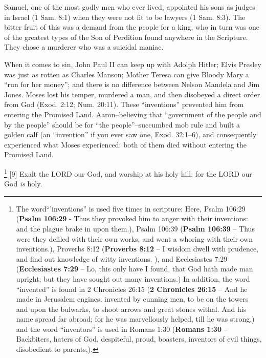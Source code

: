 {\begin{compactenum}
\item Samuel, one of
the most godly men who ever lived, appointed
his sons as judges in Israel (1 Sam. 8:1) when
they were not fit to be lawyers (1 Sam. 8:3).
The bitter fruit of this was a demand from the
people for a king, who in turn was one of the
greatest types of the Son of Perdition found
anywhere in the Scripture. They chose a
murderer who was a suicidal maniac.
\end{compactenum}
When it comes to sin, John Paul II can keep up with Adolph Hitler; Elvis Presley was just as rotten as Charles Manson; Mother Teresa can give Bloody Mary a ``run for her money''; and there is no difference between Nelson Mandela and Jim Jones. Moses lost his temper, murdered a man, and then disobeyed a direct order from God (Exod. 2:12; Num. 20:11). These “inventions” prevented him from entering the Promised Land. Aaron--believing that “government of the people and by the people” should be for “the people”--succumbed  mob rule and built a golden calf (an “invention” if you ever saw one, Exod. 32:1--6), and consequently experienced what Moses
experienced: both of them died without
entering the Promised Land. 
 \cite{Ruckman1992psalms}} \footnote{The word``'inventions'' is used five times in scripture: Here, Psalm 106:29 (\textbf{Psalm 106:29} - Thus they provoked him to anger with their inventions: and the plague brake in upon them.), Psalm 106:39 (\textbf{Psalm 106:39} -- Thus were they defiled with their own works, and went a whoring with their own inventions.), Proverbs 8:12 (\textbf{Proverbs 8:12} -- I wisdom dwell with prudence, and find out knowledge of witty inventions. ), and Ecclesiastes 7:29 (\textbf{Ecclesiastes 7:29} -- Lo, this only have I found, that God hath made man upright; but they have sought out many inventions.) In addition, the word ``invented'' is found in 2 Chronicles 26:15 (\textbf{2 Chronicles 26:15} -- And he made in Jerusalem engines, invented by cunning men, to be on the towers and upon the bulwarks, to shoot arrows and great stones withal. And his name spread far abroad; for he was marvellously helped, till he was strong.) and the word ``inventors'' is used in Romans 1:30 (\textbf{Romans 1:30} -- Backbiters, haters of God, despiteful, proud, boasters, inventors of evil things, disobedient to parents,).}
[9] \textcolor[rgb]{0.00,0.00,1.00}{Exalt the LORD our God, and worship at his holy hill; for the LORD our God \emph{is} holy.}

